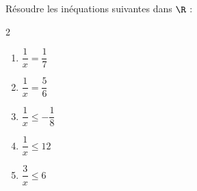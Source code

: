 \begin{exo}{}
	Résoudre les inéquations suivantes dans $\R$ :
	\vspace*{-2mm}
	\begin{multicols}{2}
		\begin{enumerate}[itemsep=2mm]
			\item $\dfrac{1}{x} = \dfrac{1}{7}$
			\item $\dfrac{1}{x} = \dfrac{5}{6}$
			\item $\dfrac{1}{x} \le -\dfrac{1}{8}$
			\item $\dfrac{1}{x} \le 12$
			\item $\dfrac{3}{x} \le 6$
		\end{enumerate}
	\end{multicols}\vspace*{-2mm}
\end{exo}
